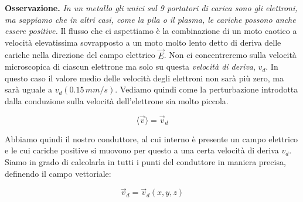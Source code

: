 \textbf{Osservazione.} \emph{In un metallo gli unici sul 9 portatori di carica sono gli elettroni, ma sappiamo che in altri casi, come la pila o il plasma, le cariche possono anche essere positive.}
Il flusso che ci aspettiamo è la combinazione di un moto caotico a velocità elevatissima sovrapposto a un moto molto lento detto di deriva delle cariche nella direzione del campo elettrico $\vec{E}$. Non ci concentreremo sulla velocità microscopica di ciascun elettrone ma solo su questa \emph{velocità di deriva}, $ v_d  $. In questo caso il valore medio delle velocità degli elettroni non sarà più zero, ma sarà uguale a $v_d (0.15\,mm/s)$. Vediamo quindi come la perturbazione introdotta dalla conduzione sulla velocità dell'elettrone sia molto piccola.

\[
	\langle \vec{v} \rangle = \vec{v}_d
\]

Abbiamo quindi il nostro conduttore, al cui interno è presente un campo elettrico e le cui cariche positive si muovono per questo a una certa velocità di deriva $ v_d  $. Siamo in grado di calcolarla in tutti i punti del conduttore in maniera precisa, definendo il campo vettoriale:

\[
	\vec{v}_d = \vec{v}_d(x,y,z)
\]

